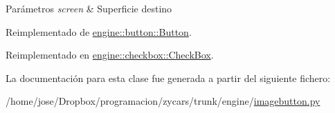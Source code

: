 \begin{DoxyParams}{\-Parámetros}
{\em screen} & \-Superficie destino \\
\hline
\end{DoxyParams}


\-Reimplementado de \hyperlink{classengine_1_1button_1_1Button_af3d2a02a9c8650f9114485aaa4fb961a}{engine\-::button\-::\-Button}.



\-Reimplementado en \hyperlink{classengine_1_1checkbox_1_1CheckBox_a102794c22e26799db2a06e9a43baf9a4}{engine\-::checkbox\-::\-Check\-Box}.



\-La documentación para esta clase fue generada a partir del siguiente fichero\-:\begin{DoxyCompactItemize}
\item 
/home/jose/\-Dropbox/programacion/zycars/trunk/engine/\hyperlink{imagebutton_8py}{imagebutton.\-py}\end{DoxyCompactItemize}
